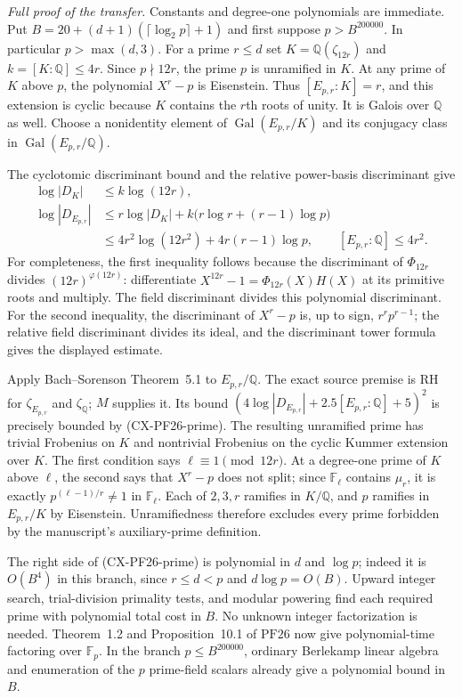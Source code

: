 \documentclass[11pt,a4paper]{article}
\begin{document}
\emph{Full proof of the transfer.}
Constants and degree-one polynomials are immediate. Put
$B=20+(d+1)(\lceil\log_2p\rceil+1)$ and first suppose
$p>B^{200000}$. In particular $p>\max(d,3)$.
For a prime $r\le d$ set $K=\mathbb Q(\zeta_{12r})$ and
$k=[K:\mathbb Q]\le4r$. Since $p\nmid12r$, the prime $p$ is
unramified in $K$. At any prime of $K$ above $p$, the polynomial
$X^r-p$ is Eisenstein. Thus $[E_{p,r}:K]=r$, and this extension is
cyclic because $K$ contains the $r$th roots of unity. It is Galois
over $\mathbb Q$ as well. Choose a nonidentity element of
$\operatorname{Gal}(E_{p,r}/K)$ and its conjugacy class in
$\operatorname{Gal}(E_{p,r}/\mathbb Q)$.

The cyclotomic discriminant bound and the relative power-basis
discriminant give
\begin{align*}
 \log|D_K|&\le k\log(12r),\\
 \log|D_{E_{p,r}}|
 &\le r\log|D_K|+
        k\bigl(r\log r+(r-1)\log p\bigr)\\
 &\le4r^2\log(12r^2)+4r(r-1)\log p,\qquad
 [E_{p,r}:\mathbb Q]\le4r^2.
\end{align*}
For completeness, the first inequality follows because the
discriminant of $\Phi_{12r}$ divides $(12r)^{\varphi(12r)}$:
differentiate $X^{12r}-1=\Phi_{12r}(X)H(X)$ at its primitive
roots and multiply. The field discriminant divides this polynomial
discriminant. For the second inequality, the discriminant of
$X^r-p$ is, up to sign, $r^rp^{r-1}$; the relative field
discriminant divides its ideal, and the discriminant tower formula
gives the displayed estimate.

Apply Bach--Sorenson Theorem~5.1 to $E_{p,r}/\mathbb Q$.
The exact source premise is RH for $\zeta_{E_{p,r}}$ and
$\zeta_{\mathbb Q}$; $M$ supplies it. Its bound
$(4\log|D_{E_{p,r}}|+2.5[E_{p,r}:\mathbb Q]+5)^2$
is precisely bounded by (CX-PF26-prime). The resulting unramified
prime has trivial Frobenius on $K$ and nontrivial Frobenius on the
cyclic Kummer extension over $K$. The first condition says
$\ell\equiv1\pmod{12r}$. At a degree-one prime of $K$ above
$\ell$, the second says that $X^r-p$ does not split; since
$\mathbb F_\ell$ contains $\mu_r$, it is exactly
$p^{(\ell-1)/r}\ne1$ in $\mathbb F_\ell$.
Each of $2,3,r$ ramifies in $K/\mathbb Q$, and $p$ ramifies
in $E_{p,r}/K$ by Eisenstein. Unramifiedness therefore excludes
every prime forbidden by the manuscript's auxiliary-prime definition.

The right side of (CX-PF26-prime) is polynomial in $d$ and
$\log p$; indeed it is $O(B^4)$ in this branch, since
$r\le d<p$ and $d\log p=O(B)$. Upward integer search,
trial-division primality tests, and modular powering find each
required prime with polynomial total cost in $B$. No unknown
integer factorization is needed. Theorem~1.2 and Proposition~10.1
of $\mathrm{PF26}$ now give polynomial-time factoring over
$\mathbb F_p$. In the branch $p\le B^{200000}$, ordinary
Berlekamp linear algebra and enumeration of the $p$ prime-field
scalars already give a polynomial bound in $B$.
\end{document}
